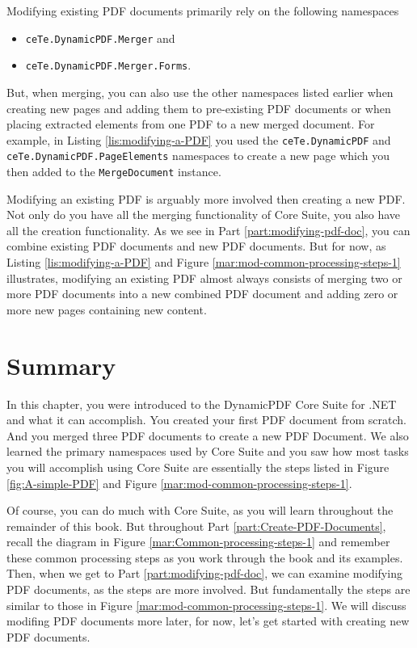 \documentclass[american,letterpaper]{tufte-book}
\numberwithin{equation}{section}
\numberwithin{figure}{section}
\begin{document}
\leavevmode\egroup
Modifying existing PDF documents primarily rely on the following namespaces
\begin{itemize}
\item \texttt{ceTe.DynamicPDF.Merger} and 
\item \texttt{ceTe.DynamicPDF.Merger.Forms}.
\end{itemize}
But, when merging, you can also use the other namespaces listed earlier when creating new pages and adding them to pre-existing PDF documents or when placing extracted elements from one PDF to a new merged document. For example, in Listing \ref{lis:modifying-a-PDF} you used the  \texttt{ceTe.DynamicPDF} and  \texttt{ceTe.DynamicPDF.PageElements} namespaces to create a new page which you then added to the \texttt{MergeDocument} instance.

Modifying an existing PDF is arguably more involved then creating a new PDF. Not only do you have all the merging functionality of Core Suite, you also have all the creation functionality. As we see in Part \ref{part:modifying-pdf-doc}, you can combine existing PDF documents and new PDF documents. But for now, as Listing  \ref{lis:modifying-a-PDF} and Figure  \ref{mar:mod-common-processing-steps-1} illustrates, modifying an existing PDF almost always consists of merging two or more PDF documents into a new combined PDF document and adding zero or more new pages containing new content.

\section{Summary}

In this chapter, you were introduced to the DynamicPDF Core Suite for
.NET and what it can accomplish. You created your first PDF document
from scratch. And you merged three PDF documents to create a new PDF Document. We also learned the primary namespaces used by Core Suite and you saw how most tasks you will accomplish using Core Suite are essentially the steps listed in Figure \ref{fig:A-simple-PDF} and Figure \ref{mar:mod-common-processing-steps-1}. 

Of course, you can do much with Core Suite, as you will learn throughout
the remainder of this book. But throughout Part \ref{part:Create-PDF-Documents}, recall the diagram
in Figure \ref{mar:Common-processing-steps-1} and remember these
common processing steps as you work through the book and its examples. Then, when we get to Part \ref{part:modifying-pdf-doc}, we can examine modifying PDF documents, as the steps are more involved. But fundamentally the steps are similar to those in Figure \ref{mar:mod-common-processing-steps-1}. We will discuss modifing PDF documents more later, for now, let's get started with creating new PDF documents.
\end{document}
